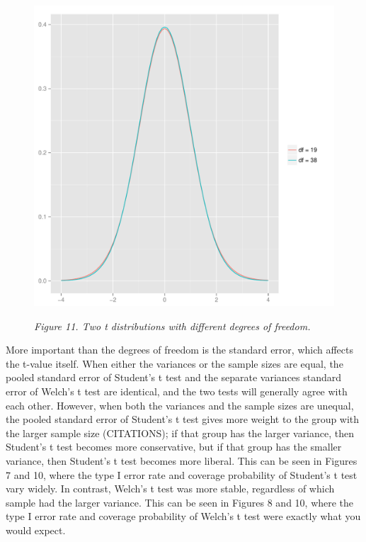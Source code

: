 \documentclass[man,a4paper,noextraspace,apacite]{apa6}\usepackage[]{graphicx}\usepackage[]{color}
\makeatletter
\def\maxwidth{ %
  \ifdim\Gin@nat@width>\linewidth
    \linewidth
  \else
    \Gin@nat@width
  \fi
}
\newenvironment{knitrout}{}{} %
\makeatother
\begin{document}
\begin{figure}  
\begin{knitrout}
\color{fgcolor}
\includegraphics[width=\maxwidth]{figure/tdist} 

\end{knitrout}
\textit{Figure 11. Two t distributions with different degrees of freedom.}
\end{figure}
    
    More important than the degrees of freedom is the standard error, which affects the t-value itself. When either the variances or the sample sizes are equal, the pooled standard error of Student's t test and the separate variances standard error of Welch's t test are identical, and the two tests will generally agree with each other. However, when both the variances and the sample sizes are unequal, the pooled standard error of Student's t test gives more weight to the group with the larger sample size (CITATIONS); if that group has the larger variance, then Student's t test becomes more conservative, but if that group has the smaller variance, then Student's t test becomes more liberal. This can be seen in Figures 7 and 10, where the type I error rate and coverage probability of Student's t test vary widely. In contrast, Welch's t test was more stable, regardless of which sample had the larger variance. This can be seen in Figures 8 and 10, where the type I error rate and coverage probability of Welch's t test were exactly what you would expect.
    
\end{document}
